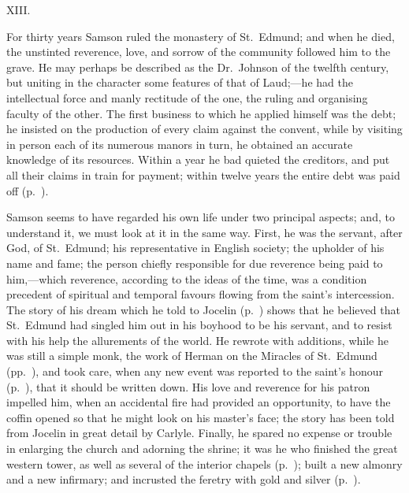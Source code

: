 \documentclass[10pt]{book}
\begin{document}
{\vspace{.3cm}
\begin{center}
XIII.
\end{center}
\noindent For thirty years Samson ruled the monastery of St.\ Edmund; and when he died, the unstinted reverence, love, and sorrow of the community followed him to the grave. He may perhaps be described as the Dr.\ Johnson of the twelfth century, but uniting in the character some features of that of Laud;---he had the intellectual force and manly rectitude of the one, the ruling and organising faculty of the other. The first business to which he applied himself was the debt; he insisted on the production of every claim against the convent, while by visiting in person each of its numerous manors in turn, he obtained an accurate knowledge of its resources. Within a year he bad quieted the creditors, and put all their claims in train for payment; within twelve years the entire debt was paid off (p.\ ).

Samson seems to have regarded his own life under two principal aspects; and, to understand it, we must look at it in the same way. First, he was the servant, after God, of St.\ Edmund; his representative in English society; the upholder of his name and fame; the person chiefly responsible for due reverence being paid to him,---which reverence, according to the ideas of the time, was a condition precedent of spiritual and temporal favours flowing from the saint's intercession. The story of his dream which he told to Jocelin (p.\ ) shows that he believed that St.\ Edmund had singled him out in his boyhood to be his servant, and to resist with his help the allurements of the world. He rewrote with additions, while he was still a simple monk, the work of Herman on the Miracles of St.\ Edmund (pp.\ ), and took care, when any new event was reported to the saint's honour (p.\ ), that it should be written down. His love and reverence for his patron impelled him, when an accidental fire had provided an opportunity, to have the coffin opened so that he might look on his master's face; the story has been told from Jocelin in great detail by Carlyle. Finally, he spared no expense or trouble in enlarging the church and adorning the shrine; it was he who finished the great western tower, as well as several of the interior chapels (p.\ ); built a new almonry and a new infirmary; and incrusted the feretry with gold and silver (p.\ ).

}
\end{document}
